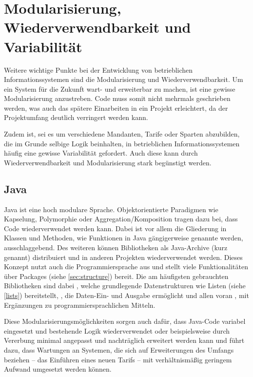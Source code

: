 \section{Modularisierung, Wiederverwendbarkeit und Variabilität}\label{wiederverwendbarkeit}

Weitere wichtige Punkte bei der Entwicklung von betrieblichen Informationssystemen sind die Modularisierung und Wiederverwendbarkeit. Um ein System für die Zukunft wart- und erweiterbar zu machen, ist eine gewisse Modularisierung anzustreben. Code muss somit nicht mehrmals geschrieben werden, was auch das spätere Einarbeiten in ein Projekt erleichtert, da der Projektumfang deutlich verringert werden kann. 

Zudem ist, sei es um \zB verschiedene Mandanten, Tarife oder Sparten abzubilden, die im Grunde selbige Logik beinhalten, in betrieblichen Informationssystemen häufig eine gewisse Variabilität gefordert. Auch diese kann durch Wiederverwendbarkeit und Modularisierung stark begünstigt werden.

\subsection*{Java}
Java ist eine hoch modulare Sprache. Objektorientierte Paradigmen wie Kapselung, Polymorphie oder Aggregation/Komposition tragen dazu bei, dass Code wiederverwendet werden kann. Dabei ist vor allem die Gliederung in Klassen und Methoden, wie Funktionen in Java gängigerweise genannte werden, ausschlaggebend. Des weiteren können Bibliotheken als Java-Archive (kurz  genannt) dis­tri­bu­ie­rt und in anderen Projekten wiederverwendet werden. Dieses Konzept nutzt auch die Programmiersprache aus und stellt viele Funktionalitäten über Packages (siehe \autoref{sec:structure}) bereit. Die am häufigsten gebrauchten Bibliotheken sind dabei , welche grundlegende Datenstrukturen wie \zB Listen (siehe \autoref{lists}) bereitstellt, , die Daten-Ein- und Ausgabe ermöglicht und allen voran , mit Ergänzungen zu programmiersprachlichen Mitteln. 

Diese Modularisierungsmöglichkeiten sorgen auch dafür, dass Java-Code variabel eingesetzt und bestehende Logik wiederverwendet oder beispielsweise durch Vererbung minimal angepasst und nachträglich erweitert werden kann und führt dazu, dass Wartungen an Systemen, die sich auf Erweiterungen des Umfangs beziehen -- \zB das Einführen eines neuen Tarifs -- mit verhältnismäßig geringem Aufwand umgesetzt werden können.


